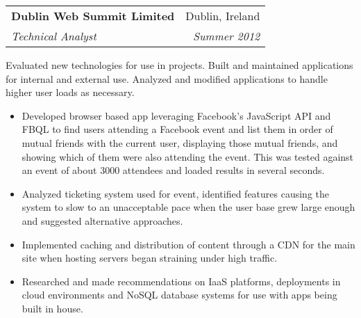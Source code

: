 \documentclass[11pt]{article}
\makeatletter
\newenvironment{resumeSubSectionHeader}{
    \par
    \begin{tabular*}{\textwidth}{l@{\extracolsep{\fill}}r}
    \par
} {
    \end{tabular*}
    \par
}
\newenvironment{resumeSubSectionBody}{
    \par
    \vspace{-0.8\parskip}
    \begin{small}
    \par
} {
    \par
    \end{small}
    \par
}
\makeatother
\begin{document}
%
%
\begin{resumeSubSectionHeader}

    \textbf{Dublin Web Summit Limited} & Dublin, Ireland   \\
    \emph{Technical Analyst}           & \emph{Summer 2012}

\end{resumeSubSectionHeader}
\begin{resumeSubSectionBody}

    Evaluated new technologies for use in projects.
    Built and maintained applications for internal and external use.
    Analyzed and modified applications to handle higher user loads
    as necessary.

    \begin{itemize}
        \item
            Developed browser based app leveraging Facebook's
            JavaScript API and FBQL to find users attending a Facebook event
            and list them in order of mutual friends with the current user,
            displaying those mutual friends, and showing which of them
            were also attending the event.
            This was tested against an event of about 3000 attendees and
            loaded results in several seconds.

        \item
            Analyzed ticketing system used for event, identified features
            causing the system to slow to an unacceptable pace when the
            user base grew large enough and suggested alternative
            approaches.

        \item
            Implemented caching and distribution of content through a CDN
            for the main site when hosting servers began straining under
            high traffic.

        \item
            Researched and made recommendations on IaaS platforms,
            deployments in cloud environments
            and NoSQL database systems for use with apps being built in
            house.
    \end{itemize}

\end{resumeSubSectionBody}
\end{document}
